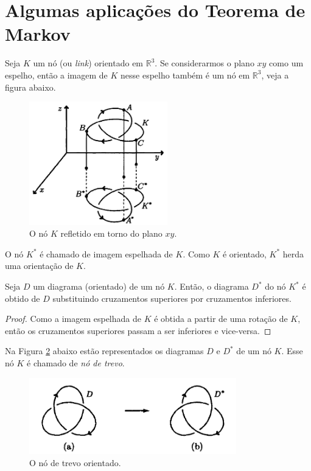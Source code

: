 	\section{Algumas aplicações do Teorema de Markov}
	Seja $K$ um nó (ou \textit{link}) orientado em $\mathbb{R}^3$. Se considerarmos o plano 
	$xy$ como um espelho, então a imagem de $K$ nesse espelho também é um nó em $\mathbb{R}^3$, 
	veja a figura abaixo.
	\begin{figure}[H]
		\begin{center}
			\includegraphics[width=6cm]{Images/no_espelhado.png}
		\end{center}\caption{O nó $K$ refletido em torno do plano $xy$.}\label{no espelhado}
	\end{figure}
	O nó $K^\ast$ é chamado de imagem espelhada de $K$. Como $K$ é orientado, $K^\ast$ 
	herda uma orientação de $K$.
	\begin{prop}
	\label{troca de cruzamentos}
		Seja $D$ um diagrama (orientado) de um nó $K$. Então, o diagrama $D^\ast$ do nó 
		$K^\ast$ é obtido de $D$ substituindo cruzamentos superiores por cruzamentos inferiores.	
	\end{prop}
	\begin{proof}
		Como a imagem espelhada de $K$ é obtida a partir de uma rotação de $K$, 
		então os cruzamentos superiores passam a ser inferiores e vice-versa.
	\end{proof}
	Na Figura \ref{no de trevo} abaixo estão representados os diagramas $D$ e $D^\ast$ 
	de um nó $K$. Esse nó $K$ é chamado de \textit{nó de trevo}.
	\begin{figure}[H]
		\begin{center}
			\includegraphics[width=9cm]{Images/no_de_trevo.png}
		\end{center}\caption{O nó de trevo orientado.}
		\label{no de trevo}
	\end{figure} 
